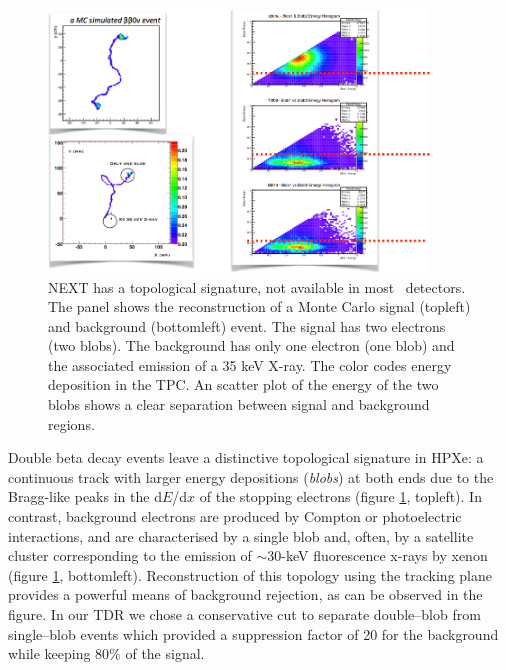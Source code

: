 \begin{figure}
\centering
\includegraphics[width=0.9\textwidth]{img/Topology.png}
\caption{\small NEXT has a topological signature, not available in most \bbonu\ detectors. The panel shows the reconstruction of a Monte Carlo signal (topleft) and background (bottomleft) event. The signal has two electrons (two blobs). The background has only one electron (one blob) and the associated emission of a 35 keV X-ray. The color codes energy deposition in the TPC. An scatter plot of the energy of the two blobs shows a clear separation between signal and background regions.}\label{fig.ETRK2}
\end{figure}
	
Double beta decay events leave a distinctive topological signature in HPXe: a continuous track with larger energy depositions (\emph{blobs}) at both ends due to the Bragg-like peaks in the d$E$/d$x$ of the stopping electrons (figure \ref{fig.ETRK2}, topleft). In contrast, background electrons are produced by Compton or photoelectric interactions, and are characterised by a single blob and, often, by a satellite cluster corresponding to the emission of $\sim30$-keV fluorescence x-rays by xenon (figure \ref{fig.ETRK2}, bottomleft).
Reconstruction of this topology using the tracking plane provides a powerful means of background rejection, as can be observed in the figure. In our TDR we chose a conservative cut to separate double--blob from single--blob events which provided a suppression factor of 20 for the background while keeping 80\% of the signal.  


